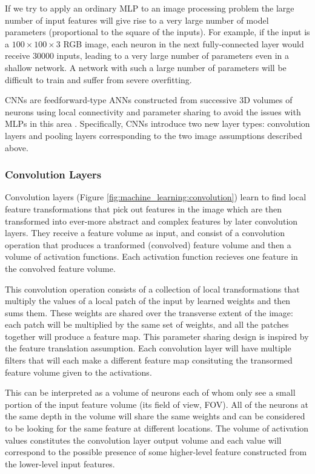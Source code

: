 If we try to apply an ordinary MLP to an image processing problem the large number of input features will give rise to a very large number of model parameters (proportional to the square of the inputs). 
For example, if the input is a $100\times{}100\times{}3$ RGB image, each neuron in the next fully-connected layer would receive $30000$ inputs, leading to a very large number of parameters even in a shallow network. A network with such a large number of parameters will be difficult to train and suffer from severe overfitting.

CNNs are feedforward-type ANNs constructed from successive 3D volumes of neurons using local connectivity and parameter sharing to avoid the issues with MLPs in this area \cite{CS231n}. Specifically, CNNs introduce two new layer types: convolution layers and pooling layers corresponding to the two image assumptions described above.



\subsubsection{Convolution Layers}
Convolution layers (Figure \ref{fig:machine_learning:convolution}) learn to find local feature transformations that pick out features in the image which are then transformed into ever-more abstract and complex features by later convolution layers. 
They receive a feature volume as input, and consist of a convolution operation that produces a tranformed (convolved) feature volume and then a volume of activation functions. 
Each activation function recieves one feature in the convolved feature volume.  


This convolution operation consists of a collection of local transformations that multiply the values of a local patch of the input by learned weights and then sums them. These weights are shared over the transverse extent of the image: each patch will be multiplied by the same set of weights, and all the patches together will produce a feature map. This parameter sharing design is inspired by the feature translation assumption. Each convolution layer will have multiple filters that will each make a different feature map consituting the transormed feature volume given to the activations.


This can be interpreted as a volume of neurons each of whom only see a small portion of the input feature volume (its field of view, FOV). All of the neurons at the same depth in the volume will share the same weights and can be considered to be looking for the same feature at different locations. The volume of activation values constitutes the convolution layer output volume and each value will correspond to the possible presence of some higher-level feature constructed from the lower-level input features. 

